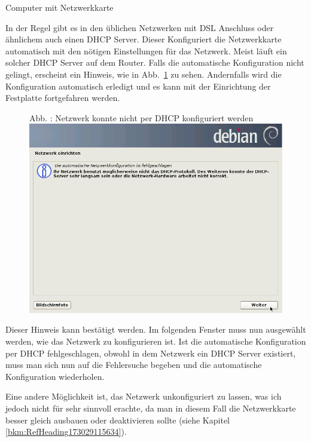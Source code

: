 \documentclass[a4paper,12pt,twoside]{article}
\newcounter{Abb}
\renewcommand\theAbb{\arabic{Abb}}
\begin{document}
\bigskip

Computer mit Netzwerkkarte

In der Regel gibt es in den üblichen Netzwerken mit DSL Anschluss oder
ähnlichem auch einen DHCP Server. Dieser Konfiguriert die Netzwerkkarte
automatisch mit den nötigen Einstellungen für das Netzwerk. Meist läuft
ein solcher DHCP Server auf dem Router. Falls die automatische
Konfiguration nicht gelingt, erscheint ein Hinweis, wie in
Abb.~\ref{seq:refAbb5} zu sehen. Andernfalls wird die Konfiguration
automatisch erledigt und es kann mit der Einrichtung der Festplatte
fortgefahren werden.


\bigskip


\bigskip



\begin{figure}
\centering
\begin{minipage}{11.197cm}
Abb. {\theAbb\label{seq:refAbb5}}: Netzwerk konnte
nicht per DHCP konfiguriert werden
\includegraphics[width=11.197cm,height=8.373cm]{efaLivede-img/efaLivede-img7.png}\end{minipage}
\end{figure}
Dieser Hinweis kann bestätigt werden. Im folgenden Fenster muss nun
ausgewählt werden, wie das Netzwerk zu konfigurieren ist. Ist die
automatische Konfiguration per DHCP fehlgeschlagen, obwohl in dem
Netzwerk ein DHCP Server existiert, muss man sich nun auf die
Fehlersuche begeben und die automatische Konfiguration wiederholen.

Eine andere Möglichkeit ist, das Netzwerk unkonfiguriert zu lassen, was
ich jedoch nicht für sehr sinnvoll erachte, da man in diesem Fall die
Netzwerkkarte besser gleich ausbauen oder deaktivieren sollte (siehe
Kapitel \ref{bkm:RefHeading173029115634}).
\end{document}

